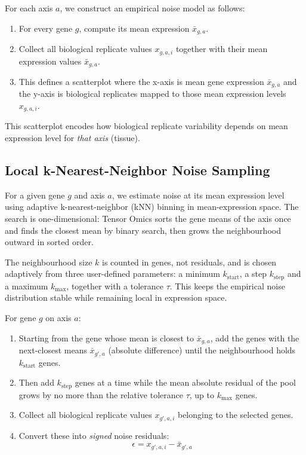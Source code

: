         For each axis $a$, we construct an empirical noise model as follows:

        \begin{enumerate}
            \item For every gene $g$, compute its mean expression $\bar{x}_{g,a}$.
            \item Collect all biological replicate values $x_{g,a,i}$ together with their mean expression values $\bar{x}_{g,a}$.
            \item This defines a scatterplot where the x-axis is mean gene expression $\bar{x}_{g,a}$ and the y-axis is biological replicates mapped to those mean expression levels $x_{g,a,i}$.
        \end{enumerate}

        This scatterplot encodes how biological replicate variability depends on mean expression level for \emph{that axis} (tissue).

    \subsection{Local k-Nearest-Neighbor Noise Sampling}\label{ssec:knn_noise_sampling}

        For a given gene $g$ and axis $a$, we estimate noise at its mean expression level using adaptive k-nearest-neighbor (kNN) binning in mean-expression space. The search is one-dimensional: Tensor Omics sorts the gene means of the axis once and finds the closest mean by binary search, then grows the neighbourhood outward in sorted order.

        The neighbourhood size $k$ is counted in genes, not residuals, and is chosen adaptively from three user-defined parameters: a minimum $k_{\mathrm{start}}$, a step $k_{\mathrm{step}}$ and a maximum $k_{\mathrm{max}}$, together with a tolerance $\tau$. This keeps the empirical noise distribution stable while remaining local in expression space.

        For gene $g$ on axis $a$:

        \begin{enumerate}
            \item Starting from the gene whose mean is closest to $\bar{x}_{g,a}$, add the genes with the next-closest means $\bar{x}_{g',a}$ (absolute difference) until the neighbourhood holds $k_{\mathrm{start}}$ genes.
            \item Then add $k_{\mathrm{step}}$ genes at a time while the mean absolute residual of the pool grows by no more than the relative tolerance $\tau$, up to $k_{\mathrm{max}}$ genes.
            \item Collect all biological replicate values $x_{g',a,i}$ belonging to the selected genes.
            \item Convert these into \emph{signed} noise residuals:
                  \[
                      \epsilon = x_{g',a,i} - \bar{x}_{g',a}
                  \]
        \end{enumerate}

